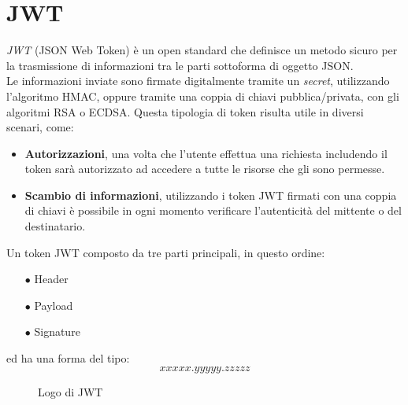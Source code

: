 \section{JWT}\label{sec:jwt}
\emph{JWT} (JSON Web Token) è un open standard che definisce un metodo sicuro per la trasmissione di informazioni tra le parti sottoforma di oggetto JSON.\\
Le informazioni inviate sono firmate digitalmente tramite un \emph{secret}, utilizzando l'algoritmo HMAC, oppure tramite una coppia di chiavi pubblica/privata, 
con gli algoritmi RSA o ECDSA. \cite{JWT}
Questa tipologia di token risulta utile in diversi scenari, come:
\begin{itemize}
	\item \textbf{Autorizzazioni}, una volta che l'utente effettua una richiesta includendo il token sarà autorizzato ad accedere a tutte le risorse che gli sono permesse.
	\item \textbf{Scambio di informazioni}, utilizzando i token JWT firmati con una coppia di chiavi è possibile in ogni momento verificare l'autenticità del mittente o del destinatario.
\end{itemize}

Un token JWT composto da tre parti principali, in questo ordine:
\begin{itemize}
	\item[$\bullet$]Header
	\item[$\bullet$]Payload
	\item[$\bullet$]Signature
\end{itemize}
ed ha una forma del tipo:
\[ xxxxx.yyyyy.zzzzz \]
\begin{figure}[h]
	\centering
	\caption{Logo di JWT}
	\label{fig:one}
\end{figure}

